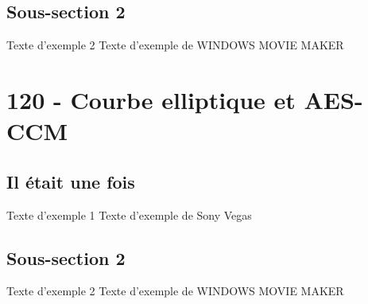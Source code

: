 \documentclass[10pt,sans,usenames,dvipsnames,french,compress]{beamer}
\begin{document}
\subsection{Sous-section 2}
\begin{frame}{Texte d'exemple 2}
	Texte d'exemple de WINDOWS MOVIE MAKER
\end{frame}

\section{120 - Courbe elliptique et AES-CCM}
\subsection{Il était une fois}
\begin{frame}{Texte d'exemple 1}
	Texte d'exemple de Sony Vegas
\end{frame}

\subsection{Sous-section 2}
\begin{frame}{Texte d'exemple 2}
	Texte d'exemple de WINDOWS MOVIE MAKER
\end{frame}
\end{document}
